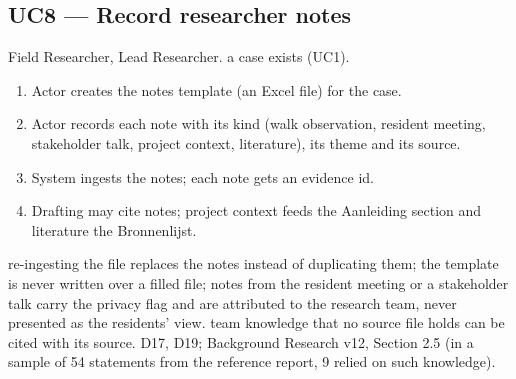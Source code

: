 \subsection{UC8 --- Record researcher notes\added}
 Field Researcher, Lead Researcher.
 a case exists (UC1).
\begin{enumerate}
\item Actor creates the notes template (an Excel file) for the case.
\item Actor records each note with its kind (walk observation, resident meeting, stakeholder talk, project context, literature), its theme and its source.
\item System ingests the notes; each note gets an  evidence id.
\item Drafting may cite notes; project context feeds the Aanleiding section and literature the Bronnenlijst.
\end{enumerate}
 re-ingesting the file replaces the notes instead of duplicating them; the template is never written over a filled file; notes from the resident meeting or a stakeholder talk carry the privacy flag and are attributed to the research team, never presented as the residents' view.
 team knowledge that no source file holds can be cited with its source.
 D17, D19; Background Research v12, Section 2.5 (in a sample of 54 statements from the reference report, 9 relied on such knowledge).


